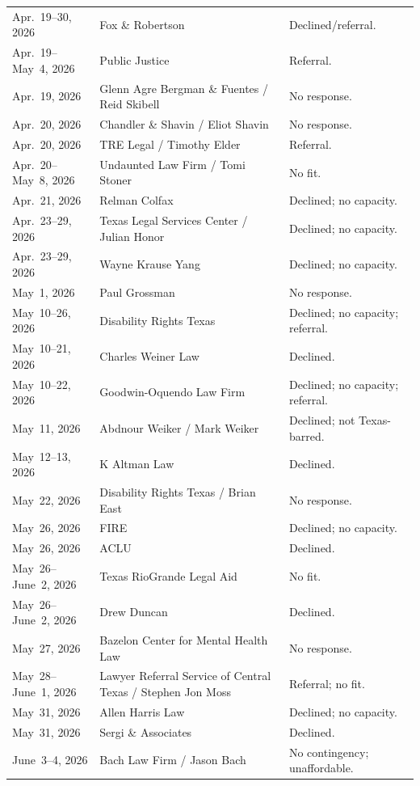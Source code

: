 \documentclass[12pt]{article}
\renewcommand{\arraystretch}{1.12}
\begin{document}
{\begin{longtable}{
  @{}
  >{\raggedright\arraybackslash}p{}
  >{\raggedright\arraybackslash}p{}
  >{\raggedright\arraybackslash}p{}
  @{}
}
Apr.~19--30, 2026 & Fox \& Robertson & Declined/referral. \\
Apr.~19--May~4, 2026 & Public Justice & Referral. \\
Apr.~19, 2026 & Glenn Agre Bergman \& Fuentes / Reid Skibell & No response. \\
Apr.~20, 2026 & Chandler \& Shavin / Eliot Shavin & No response. \\
Apr.~20, 2026 & TRE Legal / Timothy Elder & Referral. \\
Apr.~20--May~8, 2026 & Undaunted Law Firm / Tomi Stoner & No fit. \\
Apr.~21, 2026 & Relman Colfax & Declined; no capacity. \\
Apr.~23--29, 2026 & Texas Legal Services Center / Julian Honor & Declined; no capacity. \\
Apr.~23--29, 2026 & Wayne Krause Yang & Declined; no capacity. \\
May~1, 2026 & Paul Grossman & No response. \\
May~10--26, 2026 & Disability Rights Texas & Declined; no capacity; referral. \\
May~10--21, 2026 & Charles Weiner Law & Declined. \\
May~10--22, 2026 & Goodwin-Oquendo Law Firm & Declined; no capacity; referral. \\
May~11, 2026 & Abdnour Weiker / Mark Weiker & Declined; not Texas-barred. \\
May~12--13, 2026 & K Altman Law & Declined. \\
May~22, 2026 & Disability Rights Texas / Brian East & No response. \\
May~26, 2026 & FIRE & Declined; no capacity. \\
May~26, 2026 & ACLU & Declined. \\
May~26--June~2, 2026 & Texas RioGrande Legal Aid & No fit. \\
May~26--June~2, 2026 & Drew Duncan & Declined. \\
May~27, 2026 & Bazelon Center for Mental Health Law & No response. \\
May~28--June~1, 2026 & Lawyer Referral Service of Central Texas / Stephen Jon Moss & Referral; no fit. \\
May~31, 2026 & Allen Harris Law & Declined; no capacity. \\
May~31, 2026 & Sergi \& Associates & Declined. \\
June~3--4, 2026 & Bach Law Firm / Jason Bach & No contingency; unaffordable. \\
\end{longtable}
}
\setlength{\tabcolsep}{3pt}
\renewcommand{\arraystretch}{1.12}
\end{document}
